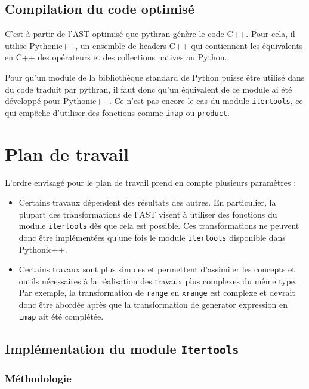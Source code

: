 \documentclass[a4paper]{article}
\begin{document}
\subsection{Compilation du code optimisé}

\label{Pythonicpp}

C'est à partir de l'AST optimisé que pythran génère le code C++. Pour
cela, il utilise Pythonic++, un ensemble de headers C++ qui
contiennent les équivalents en C++ des opérateurs et des collections
natives au Python.

Pour qu'un module de la bibliothèque standard de Python puisse être
utilisé dans du code traduit par pythran, il faut donc qu'un
équivalent de ce module ai été développé pour Pythonic++. Ce n'est pas
encore le cas du module \texttt{itertools}, ce qui empêche d'utiliser des
fonctions comme \texttt{imap} ou \texttt{product}.

\section{Plan de travail}

L'ordre envisagé pour le plan de travail prend en compte plusieurs
paramètres :

\begin{itemize}
\item Certains travaux dépendent des résultats des autres. En
  particulier, la plupart des transformations de l'AST visent à
  utiliser des fonctions du module \texttt{itertools} dès que cela est
  possible. Ces transformations ne peuvent donc être implémentées
  qu'une fois le module \texttt{itertools} disponible dans Pythonic++.
\item Certains travaux sont plus simples et permettent d'assimiler les
  concepts et outils nécessaires à la réalisation des travaux plus
  complexes du même type. Par exemple, la transformation de \texttt{range} en
  \texttt{xrange} est complexe et devrait donc être abordée après que la
  transformation de generator expression en \texttt{imap} ait été complétée.
\end{itemize}

\subsection{Implémentation du module \texttt{Itertools}}

\subsubsection{Méthodologie}
\end{document}
